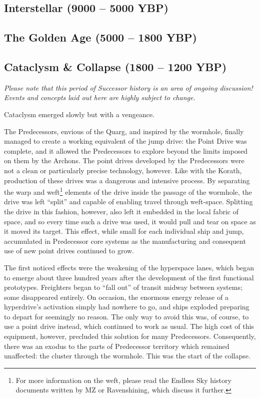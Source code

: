 \documentclass[11pt]{report}
\begin{document}
    \subsection{Interstellar (9000 -- 5000 YBP)}

    \subsection{The Golden Age (5000 -- 1800 YBP)}
    \subsection{Cataclysm \& Collapse (1800 -- 1200 YBP)}

    \emph{Please note that this period of Successor history is an area of ongoing discussion! Events and concepts laid out here are highly subject to change.}

    \medskip

    Cataclysm emerged slowly but with a vengeance. 

    The Predecessors, envious of the Quarg, and inspired by the wormhole, finally managed to create a working equivalent of the jump drive: the Point Drive was complete, and it allowed the Predecessors to explore beyond the limits imposed on them by the Archons. The point drives developed by the Predecessors were not a clean or particularly precise technology, however. Like with the Korath, production of these drives was a dangerous and intensive process. By separating the warp and weft\footnote[2]{For more information on the weft, please read the Endless Sky history documents written by MZ or Ravenshining, which discuss it further.} elements of the drive inside the passage of the wormhole, the drive was left ``split'' and capable of enabling travel through weft-space. Splitting the drive in this fashion, however, also left it embedded in the local fabric of space, and so every time such a drive was used, it would pull and tear on space as it moved its target. This effect, while small for each individual ship and jump, accumulated in Predecessor core systems as the manufacturing and consequent use of new point drives continued to grow.

    The first noticed effects were the weakening of the hyperspace lanes, which began to emerge about three hundred years after the development of the first functional prototypes. Freighters began to ``fall out'' of transit midway between systems; some disappeared entirely. On occasion, the enormous energy release of a hyperdrive's activation simply had nowhere to go, and ships exploded preparing to depart for seemingly no reason. The only way to avoid this was, of course, to use a point drive instead, which continued to work as usual. The high cost of this equipment, however, precluded this solution for many Predecessors. Consequently, there was an exodus to the parts of Predecessor territory which remained unaffected: the cluster through the wormhole. This was the start of the collapse.
\end{document}
